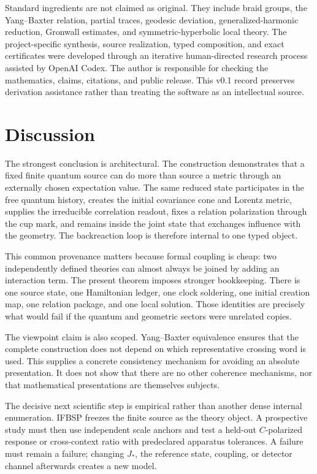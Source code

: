 \documentclass[11pt]{article}
\theoremstyle{definition}
\theoremstyle{remark}
\begin{document}
Standard ingredients are not claimed as original. They include braid groups, the Yang--Baxter relation, partial traces, geodesic deviation, generalized-harmonic reduction, Gronwall estimates, and symmetric-hyperbolic local theory. The project-specific synthesis, source realization, typed composition, and exact certificates were developed through an iterative human-directed research process assisted by OpenAI Codex. The author is responsible for checking the mathematics, claims, citations, and public release. This v0.1 record preserves derivation assistance rather than treating the software as an intellectual source.

\section{Discussion}

The strongest conclusion is architectural. The construction demonstrates that a fixed finite quantum source can do more than source a metric through an externally chosen expectation value. The same reduced state participates in the free quantum history, creates the initial covariance cone and Lorentz metric, supplies the irreducible correlation readout, fixes a relation polarization through the cup mark, and remains inside the joint state that exchanges influence with the geometry. The backreaction loop is therefore internal to one typed object.

This common provenance matters because formal coupling is cheap: two independently defined theories can almost always be joined by adding an interaction term. The present theorem imposes stronger bookkeeping. There is one source state, one Hamiltonian ledger, one clock soldering, one initial creation map, one relation package, and one local solution. Those identities are precisely what would fail if the quantum and geometric sectors were unrelated copies.

The viewpoint claim is also scoped. Yang--Baxter equivalence ensures that the complete construction does not depend on which representative crossing word is used. This supplies a concrete consistency mechanism for avoiding an absolute presentation. It does not show that there are no other coherence mechanisms, nor that mathematical presentations are themselves subjects.

The decisive next scientific step is empirical rather than another dense internal enumeration. IFBSP freezes the finite source as the theory object. A prospective study must then use independent scale anchors and test a held-out $C$-polarized response or cross-context ratio with predeclared apparatus tolerances. A failure must remain a failure; changing $J_*$, the reference state, coupling, or detector channel afterwards creates a new model.
\end{document}
